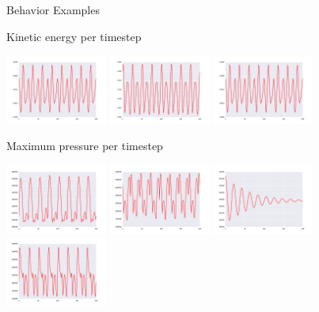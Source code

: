 \documentclass{beamer}
\begin{document}
\begin{frame}[allowframebreaks]{Behavior Examples}
\begin{minipage}{\textwidth}
\begin{block}{Kinetic energy per timestep}
\begin{center}
\includegraphics[width=0.25\textwidth]{../Figures/Behaviors/51.pdf}
\includegraphics[width=0.25\textwidth]{../Figures/Behaviors/52.pdf}
\includegraphics[width=0.25\textwidth]{../Figures/Behaviors/53.pdf}
\end{center}
\end{block}
\end{minipage}

\begin{minipage}{\textwidth}
\begin{block}{Maximum pressure per timestep}
\begin{center}
\includegraphics[width=0.25\textwidth]{../Figures/Behaviors/60.pdf}
\includegraphics[width=0.25\textwidth]{../Figures/Behaviors/61.pdf}
\includegraphics[width=0.25\textwidth]{../Figures/Behaviors/62.pdf}
\includegraphics[width=0.25\textwidth]{../Figures/Behaviors/63.pdf}
\end{center}
\end{block}
\end{minipage}

\end{frame}
\end{document}
